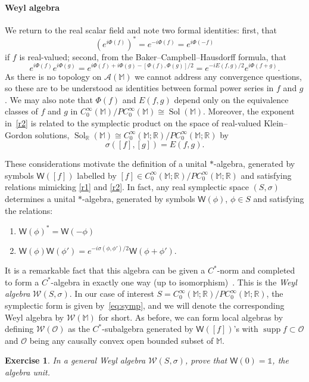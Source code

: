 \documentclass[12pt]{article}
\newcommand{\1}{\mathds{1}}                         %
\newcommand{\RR}{\mathbb{R}}           %
\newcommand{\Ocal}{\mathcal{O}}
\newcommand{\MM}{\mathbb{M}}
\newcommand{\II}{{\mathbb{1}}}
\newcommand{\Ac}{{\mathcal{A}}}
\newcommand{\Wc}{{\mathcal{W}}}
\newcommand{\Ws}{{\mathsf{W}}}
\newcommand{\CoinX}[1]{C_0^\infty(#1)}
\newtheorem{exercise}[theorem]{Exercise}
\DeclareMathOperator{\supp}{supp}
\DeclareMathOperator{\Sol}{Sol}
\begin{document}
	
	\paragraph{Weyl algebra} We return to the real scalar field and note two formal identities: first, that
	\begin{equation}\label{r1}
	(e^{i\Phi(f)})^* = e^{-i\Phi(f)} = e^{i\Phi(-f)}
	\end{equation}
	if $f$ is real-valued; second, from the 
	Baker--Campbell--Hausdorff formula, that
	\begin{equation}\label{r2}
	e^{i\Phi(f)}e^{i\Phi(g)} = e^{i\Phi(f)+i\Phi(g) - [\Phi(f),\Phi(g)]/2} = 
	e^{-iE(f,g)/2}e^{i\Phi(f+g)}.
	\end{equation} 
 As there is no topology on $\Ac(\MM)$ we cannot address any convergence questions, so these are to be understood as identities between formal power series in $f$ and $g$.
	We may also note that $\Phi(f)$ and $E(f,g)$ depend only on the equivalence classes of $f$ and $g$ in $\CoinX{\MM}/P\CoinX{\MM}\cong\Sol(\MM)$. Moreover, the exponent in~\eqref{r2} is related to the symplectic product on the space of real-valued Klein--Gordon solutions, $\Sol_\RR(\MM)\cong\CoinX{\MM;\RR}/P\CoinX{\MM;\RR}$ by
	\begin{equation}\label{eq:symp}
	\sigma([f],[g])= E(f,g).
	\end{equation}
	
	These considerations motivate the definition of a unital $*$-algebra, generated by symbols $\Ws([f])$ labelled by $[f]\in \CoinX{\MM;\RR}/P\CoinX{\MM;\RR}$ and satisfying relations mimicking \eqref{r1} and \eqref{r2}. In fact, any real symplectic space $(S,\sigma)$ determines a unital $*$-algebra, generated by symbols $\Ws(\phi)$, $\phi\in S$ and satisfying the relations:		
	\begin{enumerate}[label=\bf W\arabic{enumi},leftmargin=*,widest=2] 
		\item $\Ws(\phi)^*=\Ws(-\phi)$
		\item $\Ws(\phi)\Ws(\phi') = e^{-i\sigma(\phi,\phi')/2}\Ws(\phi+\phi')$.
	\end{enumerate}
It is a remarkable fact that this algebra can be given a $C^*$-norm and completed
to form a $C^*$-algebra in exactly one way (up to isomorphism)~\cite{BratRob:vol2}. This is the \emph{Weyl algebra} $\Wc(S,\sigma)$. In our case of interest $S=\CoinX{\MM;\RR}/P\CoinX{\MM;\RR}$, the symplectic form is given by~\eqref{eq:symp}, and we will denote the corresponding Weyl algebra by $\Wc(\MM)$ for short. As before, we can form local algebras by defining $\Wc(\Ocal)$ as the $C^*$-subalgebra generated by $\Ws([f])$'s with $\supp f\subset \Ocal$ and $\Ocal$ being any causally convex open bounded subset of $\MM$. 
\begin{exercise} 
		In a general Weyl algebra $\Wc(S,\sigma)$, prove that $\Ws(0)=\II$, the algebra unit.
\end{exercise}  
	
\end{document}
